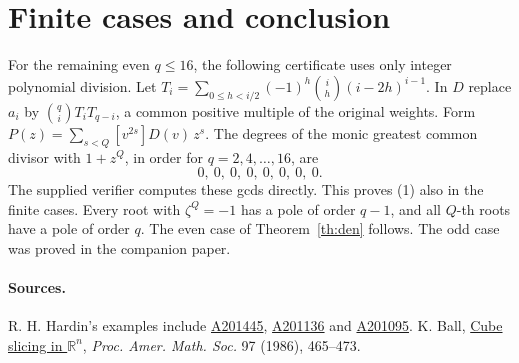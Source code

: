 \documentclass[11pt,letterpaper]{article}
\newcommand{\oeis}[1]{\href{https://oeis.org/A#1}{A#1}}
\begin{document}
\section{Finite cases and conclusion}
For the remaining even \(q\le16\), the following certificate uses only integer polynomial division. Let
\(T_i=\sum_{0\le h<i/2}(-1)^h\binom ih(i-2h)^{i-1}\). In \(D\) replace \(a_i\) by \(\binom qi T_iT_{q-i}\), a common positive multiple of the original weights. Form \(P(z)=\sum_{s<Q}[v^{2s}]D(v)\,z^s\). The degrees of the monic greatest common divisor with \(1+z^Q\), in order for \(q=2,4,\ldots,16\), are
\[
                       0,\ 0,\ 0,\ 0,\ 0,\ 0,\ 0,\ 0.
\]
The supplied verifier computes these gcds directly. This proves (1) also in the finite cases. Every root with \(\zeta^Q=-1\) has a pole of order \(q-1\), and all \(Q\)-th roots have a pole of order \(q\). The even case of Theorem~\ref{th:den} follows. The odd case was proved in the companion paper.

\paragraph{Sources.}
R. H. Hardin's examples include \oeis{201445}, \oeis{201136} and \oeis{201095}. K. Ball, \href{https://doi.org/10.1090/S0002-9939-1986-0840631-0}{Cube slicing in \(\mathbb R^n\)}, \emph{Proc. Amer. Math. Soc.} 97 (1986), 465--473.
\end{document}
